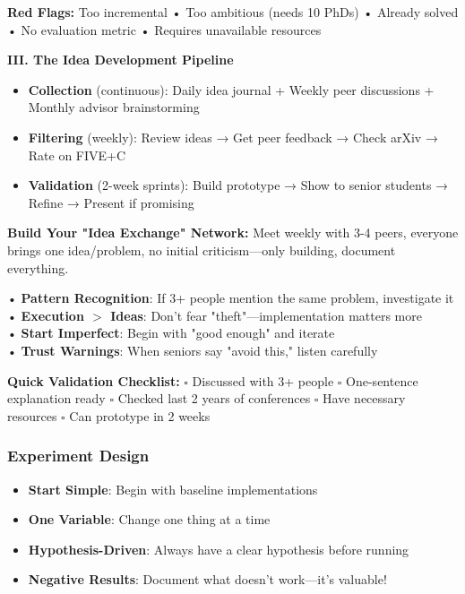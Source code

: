 \documentclass[11pt,a4paper]{article}
\begin{document}
\textbf{Red Flags:} Too incremental • Too ambitious (needs 10 PhDs) • Already solved • No evaluation metric • Requires unavailable resources

\textbf{III. The Idea Development Pipeline}

\begin{itemize}
    \item \textbf{Collection} (continuous): Daily idea journal + Weekly peer discussions + Monthly advisor brainstorming
    \item \textbf{Filtering} (weekly): Review ideas → Get peer feedback → Check arXiv → Rate on FIVE+C
    \item \textbf{Validation} (2-week sprints): Build prototype → Show to senior students → Refine → Present if promising
\end{itemize}

\textbf{Build Your "Idea Exchange" Network:} Meet weekly with 3-4 peers, everyone brings one idea/problem, no initial criticism—only building, document everything.

\begin{tcolorbox}[colback=yellow!10,colframe=red!50,title=Key Lessons]
• \textbf{Pattern Recognition}: If 3+ people mention the same problem, investigate it\\
• \textbf{Execution $>$ Ideas}: Don't fear "theft"—implementation matters more\\
• \textbf{Start Imperfect}: Begin with "good enough" and iterate\\
• \textbf{Trust Warnings}: When seniors say "avoid this," listen carefully
\end{tcolorbox}

\textbf{Quick Validation Checklist:}
$\square$ Discussed with 3+ people
$\square$ One-sentence explanation ready
$\square$ Checked last 2 years of conferences
$\square$ Have necessary resources
$\square$ Can prototype in 2 weeks

\subsubsection{Experiment Design}
\begin{itemize}
    \item \textbf{Start Simple}: Begin with baseline implementations
    \item \textbf{One Variable}: Change one thing at a time
    \item \textbf{Hypothesis-Driven}: Always have a clear hypothesis before running
    \item \textbf{Negative Results}: Document what doesn't work—it's valuable!
\end{itemize}
\end{document}
